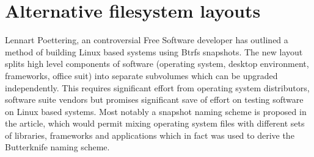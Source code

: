 \documentclass[a4paper,11pt]{kth-mag}
\begin{document}
\section{Alternative filesystem layouts}

Lennart Poettering, an controversial Free Software developer has outlined a method
\cite{revisiting-how-we-put-together-linux-systems}
of building Linux based systems using Btrfs snapshots.
The new layout splits high level components of software
(operating system, desktop environment, frameworks, office suit)
into separate subvolumes which can be upgraded independently.
This requires significant effort from operating system distributors,
software suite vendors but promises significant save of effort on testing
software on Linux based systems.
Most notably a snapshot naming scheme is proposed in the article,
which would permit mixing operating system files with different
sets of libraries, frameworks and applications which
in fact was used to derive the Butterknife naming scheme.




%
%
%
%

\appendix



\clearpage
\twocolumn
\printglossaries
\clearpage
\onecolumn
\end{document}
